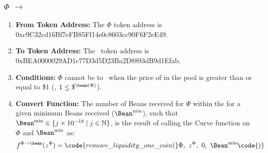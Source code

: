 \documentclass[class=article, crop=false]{standalone}
\begin{document}
\subsubsection{$\Phi$ $\rightarrow$ \Bean}
    \begin{enumerate}
        \item \textbf{From Token Address:} The $\Phi$ token address is 0xc9C32cd16Bf7eFB85Ff14e0c8603cc90F6F2eE49.
        \item \textbf{To Token Address:} The \Bean\ token address is 0xBEA0000029AD1c77D3d5D23Ba2D8893dB9d1Efab.
        \item \textbf{Conditions:}  $\Phi$ cannot be  to  \Bean\ when the price of  in the pool is greater than or equal to \$1 (, $1 \leq \$^{\bean(\Phi)}$). 
        \item \textbf{Convert Function:} The number of Beans received for   $\Phi$ within the  for a given minimum Beans received ($\Bean^{\text{min}}$), such that $\Bean^{\text{min}} \in \{j \times 10^{-18} \mid j \in \mathbb{N} \}$, is the result of calling the Curve  function on $\Phi$ and $\Bean^{\text{min}}$ as:
$$f^{\Phi \rightarrow \bean}(z^{\Phi}) = \code{remove\_liquidity\_one\_coin(} \Phi,\ z^{\Phi},\ 0,\ \Bean^{\text{min}} \code{)}$$
    \end{enumerate}
\end{document}
